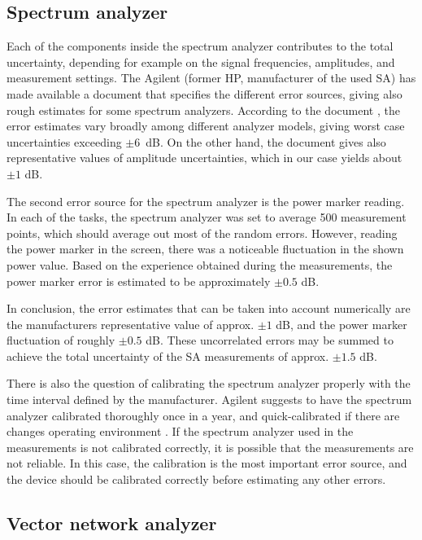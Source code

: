 \documentclass[a4paper, 12pt]{article}
\begin{document}
\subsection{Spectrum analyzer}

Each of the components inside the spectrum analyzer contributes to the total uncertainty, 
depending for example on the signal frequencies, amplitudes, and measurement settings. 
The Agilent (former HP, manufacturer of the used SA) has made available a document that 
specifies the different error sources, giving also rough estimates for some spectrum 
analyzers. According to the document \cite{sa}, the error estimates vary broadly among 
different analyzer models, giving worst case uncertainties exceeding $\pm 6$~dB. On the 
other hand, the document gives also representative values of amplitude uncertainties, 
which in our case yields about $\pm 1$ dB.

The second error source for the spectrum analyzer is the power marker reading. In 
each of the tasks, the spectrum analyzer was set to average 500 measurement points, 
which should average out most of the random errors. However, reading the power marker 
in the screen, there was a noticeable fluctuation in the shown power value. Based on the 
experience obtained during the measurements, the power marker error is estimated to be 
approximately $\pm 0.5$ dB.

In conclusion, the error estimates that can be taken into account numerically are 
the manufacturers representative value of approx. $\pm 1$ dB, and the power marker 
fluctuation of roughly $\pm 0.5$ dB. These uncorrelated errors may be summed to 
achieve the total uncertainty of the SA measurements of approx. $\pm 1.5$ dB. 

There is also the question of calibrating the spectrum analyzer properly with 
the time interval defined by the manufacturer. Agilent suggests to have the spectrum 
analyzer calibrated thoroughly once in a year, and quick-calibrated if there are 
changes operating environment \cite{sa2}. If the spectrum analyzer used in the 
measurements is not calibrated correctly, it is possible that the measurements are 
not reliable. In this case, the calibration is the most important error source, and 
the device should be calibrated correctly before estimating any other errors.


\subsection{Vector network analyzer}
\end{document}
